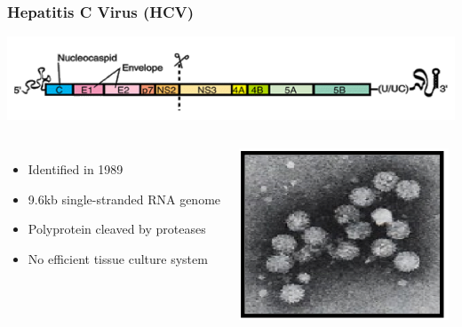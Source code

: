 \begin{frame}
\frametitle{Hepatitis C Virus (HCV)}

\includegraphics[width=\textwidth]{../../images/HCV1}

\begin{columns}[t]


\begin{itemize}
	\item Identified in 1989
	\item 9.6kb single-stranded RNA genome 
	\item Polyprotein cleaved by proteases
	\item No efficient tissue culture system
\end{itemize}


\includegraphics[width=\textwidth]{../../images/HCV2}

\end{columns}

\end{frame}
